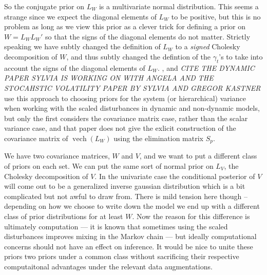 \documentclass{article}
\DeclareMathOperator{\vech}{vech}
\begin{document}
So the conjugate prior on $L_W$ is a multivariate normal distribution. This seems a strange since we expect the diagonal elements of $L_W$ to be positive, but this is no problem as long as we view this prior as a clever trick for defining a prior on $W=L_WL_W'$ so that the signs of the diagonal elements do not matter. Strictly speaking we have subtly changed the definition of $L_W$ to a {\it signed} Cholesky decomposition of $W$, and thus subtly changed the defintion of the $\gamma_t$'s to take into account the signs of the diagonal elements of $L_W$. \cite{fruhwirth2008bayesian}, \cite{fruhwirth2011bayesian} and {\it CITE THE DYNAMIC PAPER SYLVIA IS WORKING ON WITH ANGELA AND THE STOCAHSTIC VOLATILITY PAPER BY SYLVIA AND GREGOR KASTNER} use this approach to choosing priors for the system (or hierarchical) variance when working with the scaled disturbances in dynamic and non-dynamic models, but only the first considers the covariance matrix case, rather than the scalar variance case, and that paper does not give the exlicit construction of the covariance matrix of $\vech(L_W)$ using the elimination matrix $S_p$.

We have two covariance matrices, $W$ and $V$, and we want to put a different class of priors on each set. We can put the same sort of normal prior on $L_V$, the Cholesky decomposition of $V$. In the univariate case the conditional posterior of $V$ will come out to be a generalized inverse gaussian distribution which is a bit complicated but not awful to draw from. There is mild tension here though --  depending on how we choose to write down the model we end up with a different class of prior distributions for at least $W$. Now the reason for this difference is ultimately computation --- it is known that sometimes using the scaled disturbances improves mixing in the Markov chain --- but ideally computational concerns should not have an effect on inference. It would be nice to unite these priors two priors under a common class without sacrificing their respective computaitonal advantages under the relevant data augmentations. 
\end{document}
